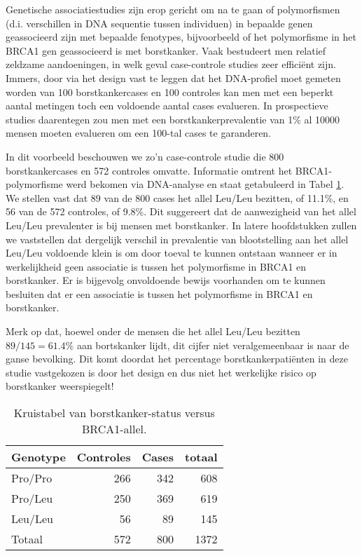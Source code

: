 \documentclass[
  12pt,dutch,coursenotes]{book}
\theoremstyle{definition}
\theoremstyle{definition}
\theoremstyle{definition}
\theoremstyle{remark}
\begin{document}
Genetische associatiestudies zijn erop gericht om na te gaan of polymorfismen (d.i. verschillen in DNA sequentie tussen individuen) in bepaalde genen geassocieerd zijn met bepaalde fenotypes, bijvoorbeeld of het polymorfisme in het BRCA1 gen geassocieerd is met borstkanker. Vaak bestudeert men relatief zeldzame aandoeningen, in welk geval case-controle studies zeer efficiënt zijn. Immers, door via het design vast te leggen dat het DNA-profiel moet gemeten worden van 100 borstkankercases en 100 controles kan men met een beperkt aantal metingen toch een voldoende aantal cases evalueren. In prospectieve studies daarentegen zou men met een borstkankerprevalentie van 1\% al 10000 mensen moeten evalueren om een 100-tal cases te garanderen.

In dit voorbeeld beschouwen we zo'n case-controle studie die 800 borstkankercases en 572 controles omvatte. Informatie omtrent het BRCA1-polymorfisme werd bekomen via DNA-analyse en staat getabuleerd in Tabel \ref{tab:leu}.
We stellen vast dat 89 van de 800 cases het allel Leu/Leu bezitten, of 11.1\%, en 56 van de 572 controles, of 9.8\%. Dit suggereert dat de aanwezigheid van het allel Leu/Leu prevalenter is bij mensen met borstkanker. In latere hoofdstukken zullen
we vaststellen dat dergelijk verschil in prevalentie van blootstelling aan
het allel Leu/Leu voldoende klein is om door toeval te kunnen ontstaan wanneer er in
werkelijkheid geen associatie is tussen het polymorfisme in BRCA1 en borstkanker. Er is bijgevolg onvoldoende bewijs voorhanden om te kunnen besluiten dat er een associatie is tussen het polymorfisme in BRCA1 en borstkanker.

Merk op dat, hoewel onder de mensen die het allel Leu/Leu bezitten \(89/145=61.4\%\) aan bortskanker lijdt, dit cijfer niet
veralgemeenbaar is naar de ganse bevolking. Dit komt doordat het percentage
borstkankerpatiënten in deze studie vastgekozen is door het design en dus
niet het werkelijke risico op borstkanker weerspiegelt!

\begin{table}[t]

\caption{\label{tab:leu}Kruistabel van borstkanker-status versus BRCA1-allel.}
\centering
\begin{tabular}{lrrr}
\toprule
Genotype & Controles & Cases & totaal\\
\midrule
Pro/Pro & 266 & 342 & 608\\
Pro/Leu & 250 & 369 & 619\\
Leu/Leu & 56 & 89 & 145\\
Totaal & 572 & 800 & 1372\\
\bottomrule
\end{tabular}
\end{table}
\end{document}
